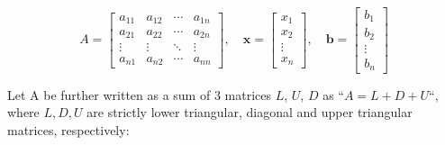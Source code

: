 \documentclass[main]{subfiles}
\begin{document}
    \begin{equation*}
        A = \begin{bmatrix}
            a_{11} & a_{12} & \cdots & a_{1n} \\
            a_{21} & a_{22} & \cdots & a_{2n} \\
            \vdots & \vdots & \ddots& \vdots \\
            a_{n1} & a_{n2} & \cdots & a_{nn}
        \end{bmatrix},
        \quad
        \textbf{x} = \begin{bmatrix}
            x_{1}  \\
            x_{2}  \\
            \vdots \\
            x_{n} 
        \end{bmatrix},
        \quad
        \textbf{b} = \begin{bmatrix}
            b_{1}  \\
            b_{2}  \\
            \vdots \\
            b_{n} 
        \end{bmatrix}
    \end{equation*}

    \clearpage

    Let A be further written as a sum of 3 matrices $L$, $U$, $D$ as ``$A = L + D + U$``, 
    \\
    where $L, D, U$ are strictly lower triangular, diagonal and upper triangular matrices, respectively:
    \\
\end{document}
